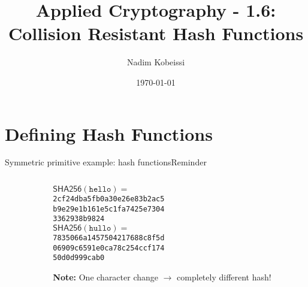 \documentclass[aspectratio=169, lualatex, handout]{beamer}
\title{Applied Cryptography - 1.6: Collision Resistant Hash Functions}
\author{Nadim Kobeissi}
\institute{American University of Beirut}
\date{\today}
\begin{document}
\begin{frame}[plain]
	\titlepage
\end{frame}

\section{Defining Hash Functions}

\begin{frame}{Symmetric primitive example: hash functions}{Reminder}
	\begin{columns}[c]
		\begin{column}{0.55\textwidth}
		\end{column}
		\begin{column}{0.45\textwidth}
			\begin{tcolorbox}
				[colback=black!5!white,colframe=ciphergray] $\mathsf{SHA256}(\texttt{hello}) =$ \\ {\small\texttt{2cf24dba5fb0a30e26e83b2ac5}\\ \texttt{b9e29e1b161e5c1fa7425e7304}\\
				\texttt{3362938b9824}}\\[1em]
				$\mathsf{SHA256}(\texttt{hullo}) =$ \\ {\small\texttt{7835066a1457504217688c8f5d}\\
				\texttt{06909c6591e0ca78c254ccf174}\\ \texttt{50d0d999cab0}}
			\end{tcolorbox}
			\textcolor{cipherprimary}{\textbf{Note:} \small One character change $\rightarrow$
				completely different hash!}
		\end{column}
	\end{columns}
\end{frame}
\end{document}
